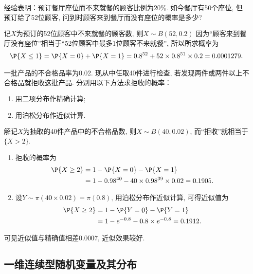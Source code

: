 \documentclass[11pt]{ctexart}
\begin{document}
\begin{example}[二项分布] 
	经验表明：预订餐厅座位而不来就餐的顾客比例为$20\%$. 
	如今餐厅有50个座位, 但预订给了52位顾客, 问到时顾客来到餐厅而没有座位的概率是多少?
\end{example}
\begin{solution}
	记$X$为预订的52位顾客中不来就餐的顾客数, 则$X \sim B(52, 0.2)$
	因为“顾客来到餐厅没有座位”相当于“52位顾客中最多1位顾客不来就餐”, 所以所求概率为
	\begin{equation*}
		\P\{X \leq 1\}
		= \P\{X = 0\} + \P\{X = 1\}
		= 0.8^{52} + 52 \times 0.8^{51} \times 0.2
		=0.000 127 9.
	\end{equation*}
\end{solution}

\begin{example}[泊松定理的应用]
	一批产品的不合格品率为0.02. 
	现从中任取40件进行检查, 若发现两件或两件以上不合格品就拒收这批产品. 
	分别用以下方法求拒收的概率：
	\begin{enumerate}
		\item 用二项分布作精确计算; 
		\item 用泊松分布作近似计算. 
	\end{enumerate}
\end{example}
\begin{solution}
	解记$X$为抽取的40件产品中的不合格品数, 则$X \sim B(40, 0.02)$, 而“拒收”就相当于$\{X>2\}$. 
	\begin{enumerate}
		\item 拒收的概率为
			\begin{align*}
				\P\{X \geq 2\} 
				&= 1 - \P\{X = 0\} - \P\{X = 1\} \\
				&= 1 - 0.98^{40} - 40 \times 0.98^{39} \times 0.02
				= 0.1905. 
			\end{align*}
		\item 设$Y \sim \pi(40 \times 0.02) = \pi(0.8)$, 用泊松分布作近似计算, 可得近似值为
			\begin{align*}
				\P\{X \geq 2\}
				&= 1 - \P\{Y = 0\} - \P\{Y = 1\} \\
				&= 1 - e^{-0.8} - 0.8 \times e^{-0.8}
				= 0.1912. 
			\end{align*}
	\end{enumerate}
	可见近似值与精确值相差$0.0007$, 近似效果较好. 
\end{solution}


\subsection{一维连续型随机变量及其分布}
\end{document}
